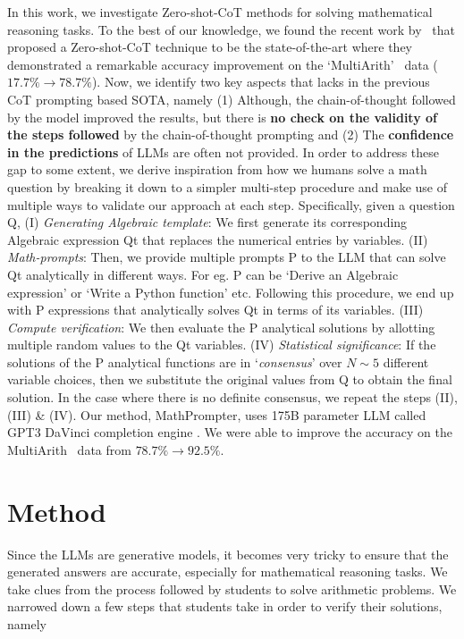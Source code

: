 In this work, we investigate Zero-shot-CoT methods for solving mathematical reasoning tasks. To the best of our knowledge, we found the recent work by~\cite{kojima2022large} that proposed a Zero-shot-CoT technique to be the state-of-the-art where they demonstrated a remarkable accuracy improvement on the `MultiArith'~\cite{roy2016solving} data ($17.7\%\rightarrow 78.7\%$). 
Now, we identify two key aspects that lacks in the previous CoT prompting based SOTA, namely (1) Although, the chain-of-thought followed by the model improved the results, but there is \textbf{no check on the validity of the steps followed} by the chain-of-thought prompting and (2) The \textbf{confidence in the predictions} of LLMs are often not provided. In order to address these gap to some extent, we derive inspiration from how we humans solve a math question by breaking it down to a simpler multi-step procedure and make use of multiple ways to validate our approach at each step. Specifically, given a question Q, (I) \textit{Generating Algebraic template}: We first generate its corresponding Algebraic expression Qt that replaces the numerical entries by variables. (II) \textit{Math-prompts}: Then, we provide multiple prompts P to the LLM that can solve Qt analytically in different ways. For eg. P can be `Derive an Algebraic expression' or `Write a Python function' etc. Following this procedure, we end up with P expressions that analytically solves Qt in terms of its variables. (III) \textit{Compute verification}: We then evaluate the P analytical solutions by allotting multiple random values to the Qt variables. (IV) \textit{Statistical significance}: If the solutions of the P analytical functions are in `\textit{consensus}' over $N\sim 5$ different variable choices, then we substitute the original values from Q to obtain the final solution. In the case where there is no definite consensus, we repeat the steps (II), (III) \& (IV). Our method, MathPrompter, uses 175B parameter LLM called GPT3 DaVinci completion engine \cite{brown2020language}. We were able to improve the accuracy on the MultiArith~ data from $78.7\%\rightarrow 92.5\%$. 

\section{Method}

Since the LLMs are generative models, it becomes very tricky to ensure that the generated answers are accurate, especially for mathematical reasoning tasks. We take clues from the process followed by students to solve arithmetic problems. We narrowed down a few steps that students take in order to verify their solutions, namely

